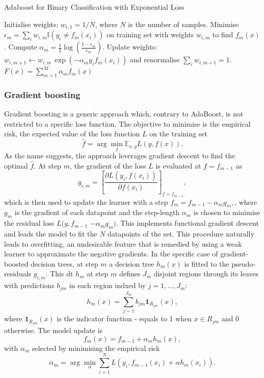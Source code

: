 \begin{algorithm}
    \caption{Adaboost for Binary Classification with Exponential Loss \cite{MurphyML}}
    \label{algo:adaboost}
    \begin{algorithmic}
    \State Initialise weights: $w_{i,1} = 1/N$, where $N$ is the number of samples.
        \State Minimise $\epsilon_m = \sum_i w_{i,m} \mathbb{I}(y_i \neq f_m(x_i))$ on training set with weights $w_{i,m}$ to find $f_m(x)$.
        \State Compute $\alpha_m = \frac{1}{2} \log\left(\frac{1 - \epsilon_m}{\epsilon_m}\right)$.
        \State Update weights: $w_{i,m+1} \leftarrow w_{i,m} \, \exp(-\alpha_m y_i f_m(x_i))$ and renormalise $\sum_i w_{i, m+1} = 1$.
    \EndFor
    \State \Return $F(x) = \sum_{m=1}^M \alpha_m f_m(x)$
    \end{algorithmic}
\end{algorithm}

\subsubsection{Gradient boosting}\label{sec-gradient-boost}
Gradient boosting is a generic approach which, contrary to AdaBoost, is not restricted to a specific loss function. The objective to minimise is the empirical risk, the expected value of the loss function $L$ on the training set 
\begin{equation}\label{eq:empRisk}
    \hat{f}  = \arg \min_f \mathbb{E}_{x,y} L(y, f(x)).
\end{equation}
As the name suggests, the approach leverages gradient descent to find the optimal $\hat{f}$. At step $m$, the gradient of the loss $L$ is evaluated at $f = f_{m-1}$ as \[ g_{i,m} = \left[ \frac{\partial  L(y_i, f(x_i))}{\partial f(x_i)} \right]_{f= f_{m-1}}, \] which is then used to update the learner with a step $f_m = f_{m-1} - \alpha_m g_{m},$, where $g_m$ is the gradient of each datapoint and the step-length $\alpha_m$ is chosen to minimise the residual loss $L(y, f_{m-1}$ $- \alpha_m g_{m})$. This implements functional gradient descent and leads the model to fit the $N$ datapoints of the set. This procedure naturally leads to overfitting, an undesirable feature that is remedied by using a weak learner to approximate the negative gradients. In the specific case of gradient-boosted decision trees, at step $m$ a decision tree $h_m(x)$ is fitted to the pseudo-residuals $g_{i,m}$. This \gls{dt} $h_m$ at step $m$ defines $J_m$ disjoint regions through its leaves with predictions $b_{jm}$ in each region indxed by $j = 1, ..., J_m$: \[ h_m(x) = \sum_{j=1}^{J_m} b_{jm} \textbf{1}_{R_{jm}}(x),\] where $\textbf{1}_{R_{jm}}(x)$ is the indicator function - equals to 1 when $x \in R_{jm}$ and 0 otherwise. The model update is \[f_m(x) = f_{m-1} + \alpha_m h_m(x),\] with $\alpha_m$ selected by minimising the empirical risk \[ \alpha_m = \arg \min_{\alpha} \sum_{i=1}^N L\left(y_i, f_{m-1}(x_i) + \alpha h_m(x_i)\right).\]


